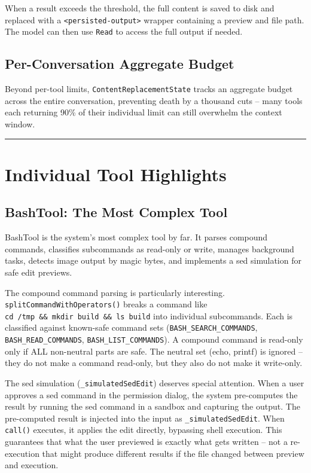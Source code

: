 \documentclass[
  english,
  11pt,
  letterpaper,
]{book}
\begin{document}
When a result exceeds the threshold, the full content is saved to disk
and replaced with a \texttt{\textless{}persisted-output\textgreater{}}
wrapper containing a preview and file path. The model can then use
\texttt{Read} to access the full output if needed.

\subsection{Per-Conversation Aggregate
Budget}\label{per-conversation-aggregate-budget}

Beyond per-tool limits, \texttt{ContentReplacementState} tracks an
aggregate budget across the entire conversation, preventing death by a
thousand cuts -- many tools each returning 90\% of their individual
limit can still overwhelm the context window.

\begin{center}\rule{0.5\linewidth}{0.5pt}\end{center}

\section{Individual Tool Highlights}\label{individual-tool-highlights}

\subsection{BashTool: The Most Complex
Tool}\label{bashtool-the-most-complex-tool}

BashTool is the system's most complex tool by far. It parses compound
commands, classifies subcommands as read-only or write, manages
background tasks, detects image output by magic bytes, and implements a
sed simulation for safe edit previews.

The compound command parsing is particularly interesting.
\texttt{splitCommandWithOperators()} breaks a command like
\texttt{cd\ /tmp\ \&\&\ mkdir\ build\ \&\&\ ls\ build} into individual
subcommands. Each is classified against known-safe command sets
(\texttt{BASH\_SEARCH\_COMMANDS}, \texttt{BASH\_READ\_COMMANDS},
\texttt{BASH\_LIST\_COMMANDS}). A compound command is read-only only if
ALL non-neutral parts are safe. The neutral set (echo, printf) is
ignored -- they do not make a command read-only, but they also do not
make it write-only.

The sed simulation (\texttt{\_simulatedSedEdit}) deserves special
attention. When a user approves a sed command in the permission dialog,
the system pre-computes the result by running the sed command in a
sandbox and capturing the output. The pre-computed result is injected
into the input as \texttt{\_simulatedSedEdit}. When \texttt{call()}
executes, it applies the edit directly, bypassing shell execution. This
guarantees that what the user previewed is exactly what gets written --
not a re-execution that might produce different results if the file
changed between preview and execution.
\end{document}
